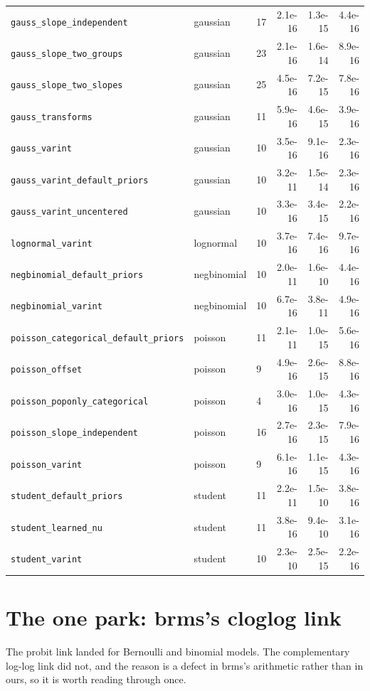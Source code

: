 \documentclass[11pt]{article}
\newcommand{\code}[1]{\texttt{#1}}
\begin{document}
\begin{center}
\begin{tabular}{@{}lllrrr@{}}
\code{gauss\_slope\_independent} & gaussian & 17 & 2.1e-16 & 1.3e-15 & 4.4e-16 \\
\code{gauss\_slope\_two\_groups} & gaussian & 23 & 2.1e-16 & 1.6e-14 & 8.9e-16 \\
\code{gauss\_slope\_two\_slopes} & gaussian & 25 & 4.5e-16 & 7.2e-15 & 7.8e-16 \\
\code{gauss\_transforms} & gaussian & 11 & 5.9e-16 & 4.6e-15 & 3.9e-16 \\
\code{gauss\_varint} & gaussian & 10 & 3.5e-16 & 9.1e-16 & 2.3e-16 \\
\code{gauss\_varint\_default\_priors} & gaussian & 10 & 3.2e-11 & 1.5e-14 & 2.3e-16 \\
\code{gauss\_varint\_uncentered} & gaussian & 10 & 3.3e-16 & 3.4e-15 & 2.2e-16 \\
\code{lognormal\_varint} & lognormal & 10 & 3.7e-16 & 7.4e-16 & 9.7e-16 \\
\code{negbinomial\_default\_priors} & negbinomial & 10 & 2.0e-11 & 1.6e-10 & 4.4e-16 \\
\code{negbinomial\_varint} & negbinomial & 10 & 6.7e-16 & 3.8e-11 & 4.9e-16 \\
\code{poisson\_categorical\_default\_priors} & poisson & 11 & 2.1e-11 & 1.0e-15 & 5.6e-16 \\
\code{poisson\_offset} & poisson & 9 & 4.9e-16 & 2.6e-15 & 8.8e-16 \\
\code{poisson\_poponly\_categorical} & poisson & 4 & 3.0e-16 & 1.0e-15 & 4.3e-16 \\
\code{poisson\_slope\_independent} & poisson & 16 & 2.7e-16 & 2.3e-15 & 7.9e-16 \\
\code{poisson\_varint} & poisson & 9 & 6.1e-16 & 1.1e-15 & 4.3e-16 \\
\code{student\_default\_priors} & student & 11 & 2.2e-11 & 1.5e-10 & 3.8e-16 \\
\code{student\_learned\_nu} & student & 11 & 3.8e-16 & 9.4e-10 & 3.1e-16 \\
\code{student\_varint} & student & 10 & 2.3e-10 & 2.5e-15 & 2.2e-16 \\
\bottomrule
\end{tabular}\end{center}
\normalsize


\section{The one park: brms's cloglog link}
\label{sec:park}

The probit link landed for Bernoulli and binomial models. The complementary log-log link did not, and the reason is a
defect in brms's arithmetic rather than in ours, so it is worth reading through once.
\end{document}
